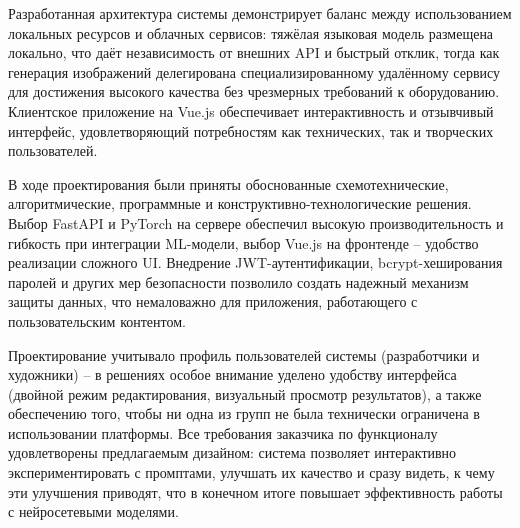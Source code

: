 Разработанная архитектура системы демонстрирует баланс между использованием локальных ресурсов и облачных сервисов: тяжёлая языковая модель размещена локально, что даёт независимость от внешних API и быстрый отклик, тогда как генерация изображений делегирована специализированному удалённому сервису для достижения высокого качества без чрезмерных требований к оборудованию. Клиентское приложение на Vue.js обеспечивает интерактивность и отзывчивый интерфейс, удовлетворяющий потребностям как технических, так и творческих пользователей.

В ходе проектирования были приняты обоснованные схемотехнические, алгоритмические, программные и конструктивно-технологические решения. Выбор FastAPI и PyTorch на сервере обеспечил высокую производительность и гибкость при интеграции ML-модели, выбор Vue.js на фронтенде – удобство реализации сложного UI. Внедрение JWT-аутентификации, bcrypt-хеширования паролей и других мер безопасности позволило создать надежный механизм защиты данных, что немаловажно для приложения, работающего с пользовательским контентом.

Проектирование учитывало профиль пользователей системы (разработчики и художники) – в решениях особое внимание уделено удобству интерфейса (двойной режим редактирования, визуальный просмотр результатов), а также обеспечению того, чтобы ни одна из групп не была технически ограничена в использовании платформы. Все требования заказчика по функционалу удовлетворены предлагаемым дизайном: система позволяет интерактивно экспериментировать с промптами, улучшать их качество и сразу видеть, к чему эти улучшения приводят, что в конечном итоге повышает эффективность работы с нейросетевыми моделями.
